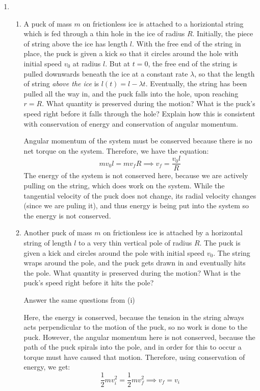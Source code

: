 \documentclass[10pt]{article}
\begin{document}
\begin{enumerate}[label=\alph*)]
\begin{solution}
						

					\end{solution}
			\item \begin{enumerate}[label=(\roman*)]
				\item A puck of mass $m$ on frictionless ice is attached to a horiziontal string which is fed 
						through a thin hole in the ice of radius $R$. Initially, the piece of string above 
						the ice has length $l$. With the free end of the string in place, the puck is given 
						a kick so that it circles around the hole with initial speed $v_0$ at radius $l$. But 
						at $t = 0$, the free end of the string is pulled downwards beneath the ice at a constant
						rate $\lambda$, so that the length of string \textit{above the ice} is $l(t) = l - 
						\lambda t$. Eventually, the string has been pulled all the way in, and the puck falls 
						into the hole, upon reaching $r =R$. 
						What quantity is preserved during the motion? What is the puck's speed right before it 
						falls through the hole? Explain how this is consistent with conservation of energy
						and conservation of angular momentum.

						\begin{solution}
								Angular momentum of the system must be conserved because there is no net torque
								on the system. Therefore, we have the equation:
								\[
								mv_0l = mv_f R \implies v_f = \frac{v_0l}{R}
								\] 
								The energy of the system is not conserved here, because we are actively pulling
								on the string, which does work on the system. While the tangential velocity of 
								the puck does not change, its radial velocity changes (since we are puling it),
								and thus energy is being put into the system so the energy is not conserved.
						\end{solution}
				\item Another puck of mass $m$ on frictionless ice is attached by a horizontal string of length
						$l$ to a very thin vertical pole of radius $R$. The puck is given a kick and circles
						around the pole with initial speed $v_0$. The string wraps around the pole, and the puck
						gets drawn in and eventually hits the pole. What quantity is preserved during the 
						motion? What is the puck's speed right before it hits the pole?

						Answer the same questions from (i)

						\begin{solution}
								Here, the energy is conserved, because the tension in the string always acts
								perpendicular to the motion of the puck, so no work is done to the puck. 
								However, the angular momentum here is not conserved, because the path of the 
								puck spirals into the pole, and in order for this to occur a torque must have
								caused that motion. Therefore, using conservation of energy, we get:
								\[
								\frac{1}{2}m v_i^2 = \frac{1}{2} m v_f^2 \implies v_f = v_i
								\] 
						\end{solution}
			\end{enumerate}	
	\end{enumerate}
\end{document}
